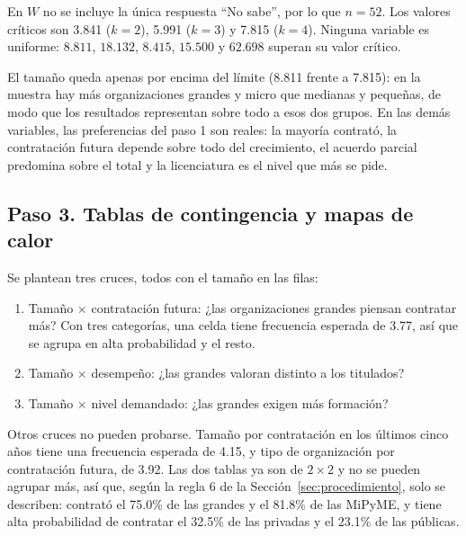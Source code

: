 \documentclass[12pt, a4paper]{article}
\begin{document}
En $W$ no se incluye la única respuesta ``No sabe'', por lo que $n = 52$.
Los valores críticos son 3.841 ($k=2$), 5.991 ($k=3$) y 7.815 ($k=4$).
Ninguna variable es uniforme: $8.811$, $18.132$, $8.415$, $15.500$ y
$62.698$ superan su valor crítico.

El tamaño queda apenas por encima del límite (8.811 frente a 7.815): en
la muestra hay más organizaciones grandes y micro que medianas y
pequeñas, de modo que los resultados representan sobre todo a esos dos
grupos. En las demás variables, las preferencias del paso 1 son reales:
la mayoría contrató, la contratación futura depende sobre todo del
crecimiento, el acuerdo parcial predomina sobre el total y la
licenciatura es el nivel que más se pide.

\subsection{Paso 3. Tablas de contingencia y mapas de calor}

Se plantean tres cruces, todos con el tamaño en las filas:

\begin{enumerate}
  \item Tamaño $\times$ contratación futura: ¿las organizaciones grandes
  piensan contratar más? Con tres categorías, una celda tiene frecuencia
  esperada de 3.77, así que se agrupa en alta probabilidad y el resto.
  \item Tamaño $\times$ desempeño: ¿las grandes valoran distinto a los
  titulados?
  \item Tamaño $\times$ nivel demandado: ¿las grandes exigen más
  formación?
\end{enumerate}

Otros cruces no pueden probarse. Tamaño por contratación en los últimos
cinco años tiene una frecuencia esperada de 4.15, y tipo de organización
por contratación futura, de 3.92. Las dos tablas ya son de $2 \times 2$ y
no se pueden agrupar más, así que, según la regla 6 de la
Sección~\ref{sec:procedimiento}, solo se describen: contrató el 75.0\% de
las grandes y el 81.8\% de las MiPyME, y tiene alta probabilidad de
contratar el 32.5\% de las privadas y el 23.1\% de las públicas.
\end{document}
